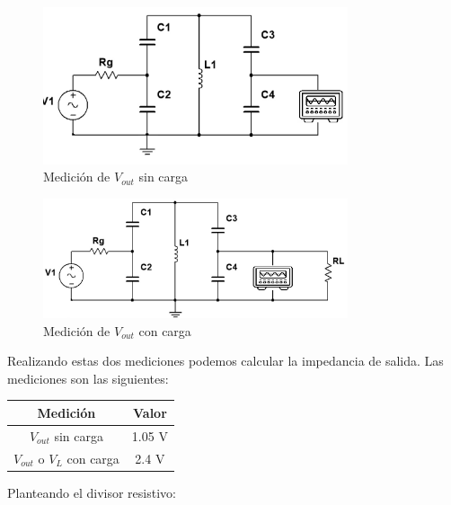 %
\begin{figure}[h]
    \centering
    \includegraphics[width=0.8\textwidth]{Imagenes/medicion_zout1.png}
    \caption{Medición de $V_{out}$ sin carga}
    \label{fig: Primer esquema de la medición de la impedancia de salida}
\end{figure}

% 
\begin{figure}[h]
    \centering
    \includegraphics[width=0.8\textwidth]{Imagenes/medicion_zout2.png}
    \caption{Medición de $V_{out}$ con carga}
    \label{fig: Segundo esquema de la medición de la impedancia de salida}
\end{figure}




Realizando estas dos mediciones podemos calcular la impedancia de salida. Las mediciones son las siguientes:

\begin{table}[h]
    \centering
    \begin{tabular}{|c|c|}
    \hline
    \rowcolor[HTML]{C0C0C0} 
    \textbf{Medición} & \textbf{Valor} \\ \hline
    $V_{out}$ sin carga            & 1.05  V         \\ \hline
    $V_{out}$ o $V_{L}$ con carga         & 2.4 V         \\ \hline
    \end{tabular}
\end{table}

Planteando el divisor resistivo:


